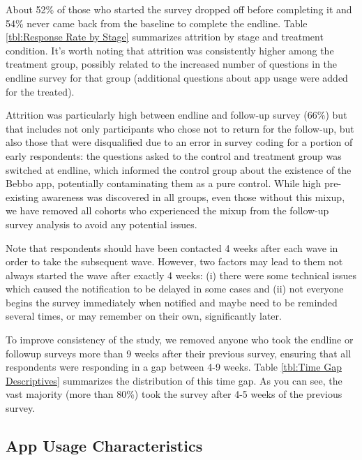 \documentclass{article}
\begin{document}
About 52\% of those who started the survey dropped off before completing it and 54\% never came back from the baseline to complete the endline. Table \ref{tbl:Response Rate by Stage} summarizes attrition by stage and treatment condition. It's worth noting that attrition was consistently higher among the treatment group, possibly related to the increased number of questions in the endline survey for that group (additional questions about app usage were added for the treated).

Attrition was particularly high between endline and follow-up survey (66\%) but that includes not only participants who chose not to return for the follow-up, but also those that were disqualified due to an error in survey coding for a portion of early respondents: the questions asked to the control and treatment group was switched at endline, which informed the control group about the existence of the Bebbo app, potentially contaminating them as a pure control. While high pre-existing awareness was discovered in all groups, even those without this mixup, we have removed all cohorts who experienced the mixup from the follow-up survey analysis to avoid any potential issues.



Note that respondents should have been contacted 4 weeks after each wave in order to take the subsequent wave. However, two factors may lead to them not always started the wave after exactly 4 weeks: (i) there were some technical issues which caused the notification to be delayed in some cases and (ii) not everyone begins the survey immediately when notified and maybe need to be reminded several times, or may remember on their own, significantly later.

To improve consistency of the study, we removed anyone who took the endline or followup surveys more than 9 weeks after their previous survey, ensuring that all respondents were responding in a gap between 4-9 weeks. Table \ref{tbl:Time Gap Descriptives} summarizes the distribution of this time gap. As you can see, the vast majority (more than 80\%) took the survey after 4-5 weeks of the previous survey.



\subsection*{App Usage Characteristics}
\end{document}
